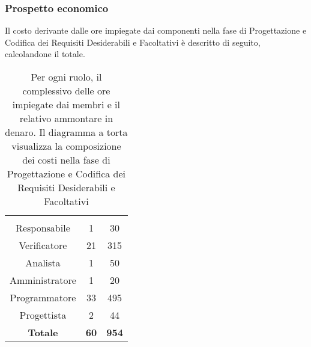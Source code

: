 \subsubsection{Prospetto economico}
Il costo derivante dalle ore impiegate dai componenti nella fase di Progettazione e Codifica dei Requisiti Desiderabili e Facoltativi è descritto di seguito, calcolandone il totale.

\begin{table}[H]
	{\setlength{\parindent}{0cm}
		\begin{minipage}{.43\textwidth}
			\begin{tabular}{ccc}
				\rowcolorhead
				\headertitle{Ruolo} & \headertitle{Ore} & \headertitle{Costo(\euro{})}\\
				Responsabile & 1 & 30\\
				Verificatore & 21 & 315\\
				Analista & 1 & 50\\
				Amministratore & 1 & 20\\
				Programmatore & 33 & 495\\
				Progettista & 2 & 44\\
				\hline
				\textbf{Totale} & \textbf{60} & \textbf{954}\\
			\end{tabular}
		\end{minipage}%
		\begin{minipage}{.57\textwidth}
	\end{minipage} }
	\caption[Prospetto economico della fase di Progettazione e Codifica dei Requisiti Desiderabili e Facoltativi]{Per ogni ruolo, il complessivo delle ore impiegate dai membri e il relativo ammontare in denaro. Il diagramma a torta visualizza la composizione dei costi nella fase di Progettazione e Codifica dei Requisiti Desiderabili e Facoltativi}
\end{table}







